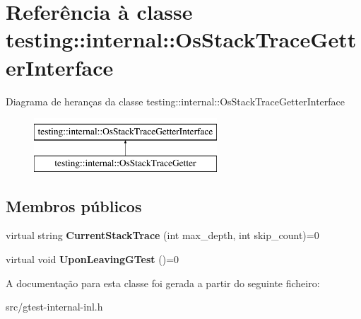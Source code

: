 \hypertarget{classtesting_1_1internal_1_1OsStackTraceGetterInterface}{\section{Referência à classe testing\-:\-:internal\-:\-:Os\-Stack\-Trace\-Getter\-Interface}
\label{classtesting_1_1internal_1_1OsStackTraceGetterInterface}
}
Diagrama de heranças da classe testing\-:\-:internal\-:\-:Os\-Stack\-Trace\-Getter\-Interface\begin{figure}[H]
\begin{center}
\leavevmode
\includegraphics[height=2.000000cm]{classtesting_1_1internal_1_1OsStackTraceGetterInterface}
\end{center}
\end{figure}
\subsection*{Membros públicos}
\begin{DoxyCompactItemize}
\item 
\hypertarget{classtesting_1_1internal_1_1OsStackTraceGetterInterface_a6965eadb9b340808718fab9f1475c49a}{virtual string {\bfseries Current\-Stack\-Trace} (int max\-\_\-depth, int skip\-\_\-count)=0}\label{classtesting_1_1internal_1_1OsStackTraceGetterInterface_a6965eadb9b340808718fab9f1475c49a}

\item 
\hypertarget{classtesting_1_1internal_1_1OsStackTraceGetterInterface_a791bd120428b5a53d5eeba1b27296a39}{virtual void {\bfseries Upon\-Leaving\-G\-Test} ()=0}\label{classtesting_1_1internal_1_1OsStackTraceGetterInterface_a791bd120428b5a53d5eeba1b27296a39}

\end{DoxyCompactItemize}


A documentação para esta classe foi gerada a partir do seguinte ficheiro\-:\begin{DoxyCompactItemize}
\item 
src/gtest-\/internal-\/inl.\-h\end{DoxyCompactItemize}
